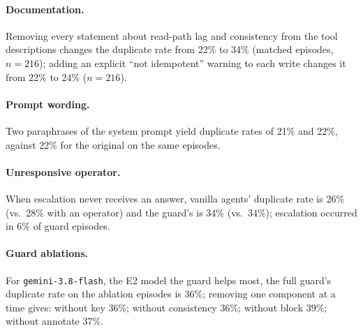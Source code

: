 \paragraph{Documentation.} Removing every statement about read-path lag and consistency from the tool descriptions changes the duplicate rate from 22\% to 34\% (matched episodes, $n=216$); adding an explicit ``not idempotent'' warning to each write changes it from 22\% to 24\% ($n=216$).

\paragraph{Prompt wording.} Two paraphrases of the system prompt yield duplicate rates of 21\% and 22\%, against 22\% for the original on the same episodes.

\paragraph{Unresponsive operator.} When escalation never receives an answer, vanilla agents' duplicate rate is 26\% (vs.\ 28\% with an operator) and the guard's is 34\% (vs.\ 34\%); escalation occurred in 6\% of guard episodes.

\paragraph{Guard ablations.} For \texttt{gemini-3.8-flash}, the E2 model the guard helps most, the full guard's duplicate rate on the ablation episodes is 36\%; removing one component at a time gives: without key 36\%; without consistency 36\%; without block 39\%; without annotate 37\%.
